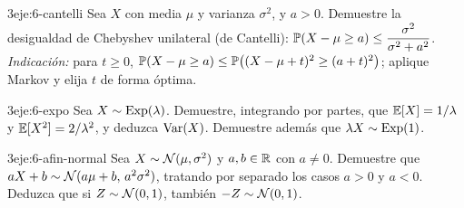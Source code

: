 \begin{ejercicio}{3}{eje:6-cantelli}
Sea $X$ con media $\mu$ y varianza $\sigma^{2}$, y $a>0$. Demuestre la desigualdad de Chebyshev unilateral (de Cantelli): $\mathbb{P}(X-\mu\ge a)\le\dfrac{\sigma^{2}}{\sigma^{2}+a^{2}}$. \emph{Indicación:} para $t\ge0$, $\mathbb{P}(X-\mu\ge a)\le\mathbb{P}\bigl((X-\mu+t)^{2}\ge(a+t)^{2}\bigr)$; aplique Markov y elija $t$ de forma óptima.
\end{ejercicio}

\begin{ejercicio}{3}{eje:6-expo}
Sea $X\sim\operatorname{Exp}(\lambda)$. Demuestre, integrando por partes, que $\mathbb{E}[X]=1/\lambda$ y $\mathbb{E}[X^{2}]=2/\lambda^{2}$, y deduzca $\operatorname{Var}(X)$. Demuestre además que $\lambda X\sim\operatorname{Exp}(1)$.
\end{ejercicio}

\begin{ejercicio}{3}{eje:6-afin-normal}
Sea $X\sim\mathcal{N}(\mu,\sigma^{2})$ y $a,b\in\mathbb{R}$ con $a\neq0$. Demuestre que $aX+b\sim\mathcal{N}(a\mu+b,\,a^{2}\sigma^{2})$, tratando por separado los casos $a>0$ y $a<0$. Deduzca que si $Z\sim\mathcal{N}(0,1)$, también $-Z\sim\mathcal{N}(0,1)$.
\end{ejercicio}
